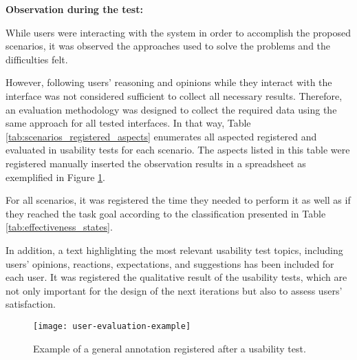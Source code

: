 \medskip
\textbf{Observation during the test:}
\medskip

While users were interacting with the system in order to accomplish the proposed scenarios, it was observed the approaches used to solve the problems and the difficulties felt.

However, following users' reasoning and opinions while they interact with the interface was not considered sufficient to collect all necessary results. Therefore, an evaluation methodology was designed to collect the required data using the same approach for all tested interfaces. In that way, Table \ref{tab:scenarios_registered_aspects} enumerates all aspected registered and evaluated in usability tests for each scenario. The aspects listed in this table were registered manually inserted the observation results in a spreadsheet as exemplified in Figure \ref{fig:userEvaluationExample}.

For all scenarios, it was registered the time they needed to perform it as well as if they reached the task goal according to the classification presented in Table \ref{tab:effectiveness_states}. 

In addition, a text highlighting the most relevant usability test topics, including users' opinions, reactions, expectations, and suggestions has been included for each user. It was registered the qualitative result of the usability tests, which are not only important for the design of the next iterations but also to assess users' satisfaction.






\begin{figure}[htbp]
	\centering
	\texttt{[image: user-evaluation-example]}
	\caption{Example of a general annotation registered after a usability test.}
	\label{fig:userEvaluationExample}
\end{figure}


